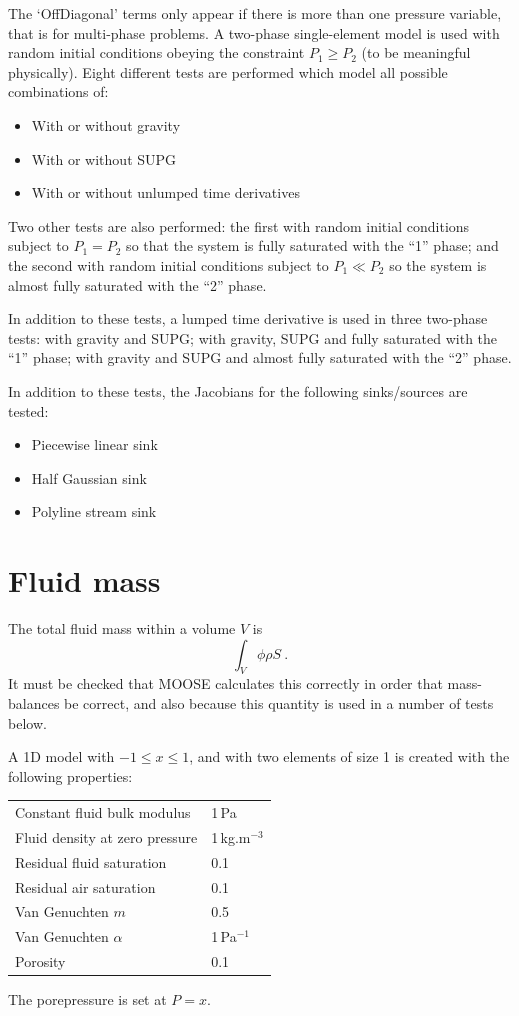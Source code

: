 \documentclass[]{scrreprt}
\begin{document}
The `OffDiagonal' terms only appear if there is more than one pressure
variable, that is for multi-phase problems.  A two-phase
single-element model is used with random initial conditions
obeying the constraint $P_{1}\geq P_{2}$ (to be meaningful physically).  Eight
different tests are performed which model all possible combinations
of:
\begin{itemize}
\item With or without gravity
\item With or without SUPG
\item With or without unlumped time derivatives
\end{itemize}
Two other tests are also performed: the first with random initial
conditions subject to $P_{1}=P_{2}$ so that the system is fully
saturated with the ``1'' phase; and the second with random initial
conditions subject to $P_{1}\ll P_{2}$ so the system is almost fully
saturated with the ``2'' phase.

In addition to these tests, a lumped time derivative is used in three
two-phase tests: with gravity and SUPG; with gravity, SUPG and fully
saturated with the ``1'' phase; with gravity and SUPG and almost fully
saturated with the ``2'' phase.

In addition to these tests, the Jacobians for the following sinks/sources are tested:
\begin{itemize}
\item Piecewise linear sink
\item Half Gaussian sink
\item Polyline stream sink
\end{itemize}



\chapter{Fluid mass}
\label{ma}

The total fluid mass within a volume $V$ is
\begin{equation}
\int_{V} \phi\rho S \ .
\end{equation}
It must be checked that MOOSE calculates this correctly in order that
mass-balances be correct, and also because this quantity is used in a
number of tests below.

A 1D model with $-1\leq x \leq 1$, and with two elements of size 1 is
created with the following properties:
\begin{center}
\begin{tabular}{|ll|}
\hline
Constant fluid bulk modulus & 1\,Pa \\
Fluid density at zero pressure & 1\,kg.m$^{-3}$ \\
Residual fluid saturation & 0.1 \\
Residual air saturation & 0.1 \\
Van Genuchten $m$ & 0.5 \\
Van Genuchten $\alpha$ & 1\,Pa$^{-1}$ \\
Porosity & 0.1 \\
\hline
\end{tabular} 
\end{center}
The porepressure is set at $P=x$.
\end{document}
